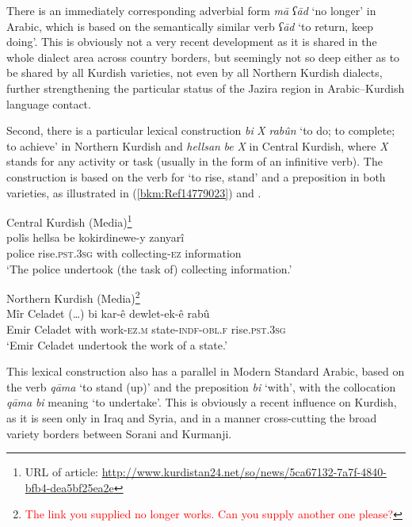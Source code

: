 \documentclass[output=paper]{langsci/langscibook}
\begin{document}
There is an immediately corresponding adverbial form \textit{mā} \textit{ʕād} ‘no longer’ in Arabic, which is based on the semantically similar verb \textit{ʕād} ‘to return, keep doing’. This is obviously not a very recent development as it is shared in the whole dialect area across country borders, but seemingly not so deep either as to be shared by all Kurdish varieties, not even by all Northern Kurdish dialects, further strengthening the particular status of the Jazira region in Arabic--Kurdish language contact. 

Second, there is a particular lexical construction \textit{bi} \textit{X} \textit{rabûn} ‘to do; to complete; to achieve’ in Northern Kurdish and \textit{hellsan} \textit{be} \textit{X} in Central Kurdish, where \textit{X} stands for any activity or task (usually in the form of an infinitive verb). The construction is based on the verb for ‘to rise, stand’ and a preposition in both varieties, as illustrated in (\ref{bkm:Ref14779023}) and .

\ea Central Kurdish (Media)\label{bkm:Ref14779023}\footnote{URL of article: \url{http://www.kurdistan24.net/so/news/5ca67132-7a7f-4840-bfb4-dea5bf25ea2e}}\\
\gll polîs hellsa be kokirdinewe-y zanyarî\\
     police rise.\textsc{pst.3sg} with collecting-\textsc{ez} information\\
\glt ‘The police undertook (the task of) collecting information.’\z

\ea\label{17} Northern Kurdish (Media)\footnote{\textcolor{red}{The link you supplied no longer works. Can you supply another one please?}}\\
\gll Mîr {Celadet (…)} bi kar-ê dewlet-ek-ê rabû\\
     Emir Celadet with work-\textsc{ez.m} state-\textsc{indf-obl.f} rise.\textsc{pst.3sg}       \\
\glt ‘Emir Celadet undertook the work of a state.’\z

This lexical construction also has a parallel in Modern Standard Arabic, based on the verb \textit{qāma} ‘to stand (up)’ and the preposition \textit{bi} ‘with’, with the collocation \textit{qāma} \textit{bi} meaning ‘to undertake’. This is obviously a recent influence on Kurdish, as it is seen only in Iraq and Syria, and in a manner cross-cutting the broad variety borders between Sorani and Kurmanji. 
\end{document}
